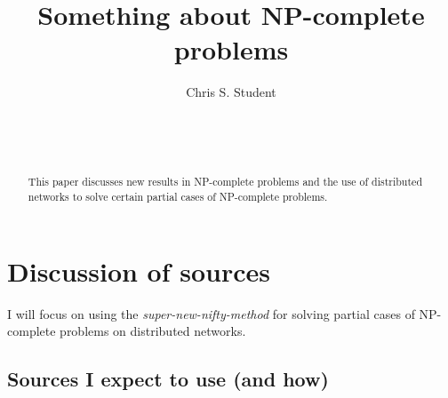 \documentclass{Sample_paper/sig-alternate}
\begin{document}

\title{Something about NP-complete problems}


\author{
\alignauthor
Chris S. Student\\
	\\
	\\
	\\
}

\maketitle

\begin{abstract}
This paper discusses new results in NP-complete problems and the use of distributed
networks to solve certain partial cases of NP-complete problems.
\end{abstract}

\section{Discussion of sources}

I will focus on using the \emph{super-new-nifty-method} for solving partial cases of
NP-complete problems on distributed networks.

\subsection{Sources I expect to use (and how)}
\end{document}
